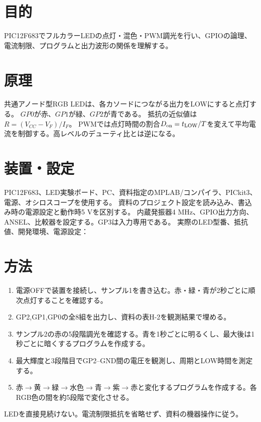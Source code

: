 \documentclass[lualatex,a4paper,10pt]{jlreq}
\begin{document}
\reporttitle
{}

\section{目的}\label{sec:auto1}
PIC12F683でフルカラーLEDの点灯・混色・PWM調光を行い、GPIOの論理、電流制限、プログラムと出力波形の関係を理解する。
\section{原理}\label{sec:auto2}
共通アノード型RGB LEDは、各カソードにつながる出力をLOWにすると点灯する。
$GP0$が赤、$GP1$が緑、$GP2$が青である。
抵抗の近似値は$R=(V_{CC}-V_F)/I_F$。
PWMでは点灯時間の割合$D_{\rm on}=t_{\rm LOW}/T$を変えて平均電流を制御する。高レベルのデューティ比とは逆になる。
\section{装置・設定}\label{sec:auto3}
PIC12F683、LED実験ボード、PC、資料指定のMPLAB/コンパイラ、PICkit3、電源、オシロスコープを使用する。
資料のプロジェクト設定を読み込み、書込み時の電源設定と動作時5 Vを区別する。
内蔵発振器4 MHz、GPIO出力方向、ANSEL、比較器を設定する。GP3は入力専用である。
実際のLED型番、抵抗値、開発環境、電源設定：
\writing{16mm}
\section{方法}\label{sec:auto4}
\begin{enumerate}
\item 電源OFFで装置を接続し、サンプル1を書き込む。赤・緑・青が2秒ごとに順次点灯することを確認する。
\item GP2,GP1,GP0の全8組を出力し、資料の表H-2を観測結果で埋める。
\item サンプル2の赤の5段階調光を確認する。青を1秒ごとに明るくし、最大後は1秒ごとに暗くするプログラムを作成する。
\item 最大輝度と3段階目でGP2--GND間の電圧を観測し、周期とLOW時間を測定する。
\item 赤$\to$黄$\to$緑$\to$水色$\to$青$\to$紫$\to$赤と変化するプログラムを作成する。各RGB色の間を約5段階で変化させる。
\end{enumerate}
LEDを直接見続けない。電流制限抵抗を省略せず、資料の機器操作に従う。
\clearpage
\end{document}
